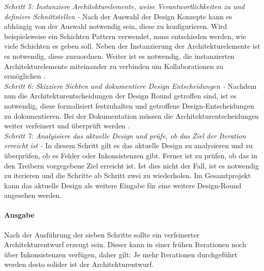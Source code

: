 \emph{Schritt 5: Instanziere Architekturelemente, weise Verantwortlichkeiten zu und definiere Schnittstellen -}
Nach der Auswahl der Design Konzepte kann es abh\"angig von der Auswahl notwendig sein, diese zu konfigurieren. Wird beispielsweise ein Schichten Pattern verwendet, muss entschieden werden, wie viele Schichten es geben soll. Neben der Instanzierung der Architekturelemente ist es notwendig, diese zuzuordnen. Weiter ist es notwendig, die instanzierten Architekturelemente miteinander zu verbinden um Kollaborationen zu erm\"oglichen \cite{Cer01}.\\

\emph{Schritt 6: Skizziere Sichten und dokumentiere Design Entscheidungen -}
Nachdem nun die Architekturentscheidungen der Design Round getroffen sind, ist es notwendig, diese formalisiert festzuhalten und getroffene Design-Entscheidungen zu dokumentieren. Bei der Dokumentation m\"ussen die Architekturentscheidungen weiter verfeinert und \"uberpr\"uft werden \cite{Cer01}. \\

\emph{Schritt 7: Analyisiere das aktuelle Design und pr\"ufe, ob das Ziel der Iteration erreicht ist -}
In diesem Schritt gilt es das aktuelle Design zu analysieren und zu \"uberpr\"ufen, ob es Fehler oder Inkonsistenzen gibt. Ferner ist zu pr\"ufen, ob das in den Treibern vorgegebene Ziel erreicht ist. Ist dies nicht der Fall, ist es notwendig zu iterieren und die Schritte ab Schritt zwei zu wiederholen. Im Gesamtprojekt kann das aktuelle Design als weitere Eingabe f\"ur eine weitere Design-Round angesehen werden. 

\paragraph{Ausgabe}
Nach der Ausf\"uhrung der sieben Schritte sollte ein verfeinerter Architekturentwurf erzeugt sein. Dieser kann in einer fr\"uhen Iterationen noch \"uber Inkonsistenzen verf\"ugen, daher gilt: Je mehr Iterationen durchgef\"uhrt werden desto solider ist der Architekturentwurf. \\
